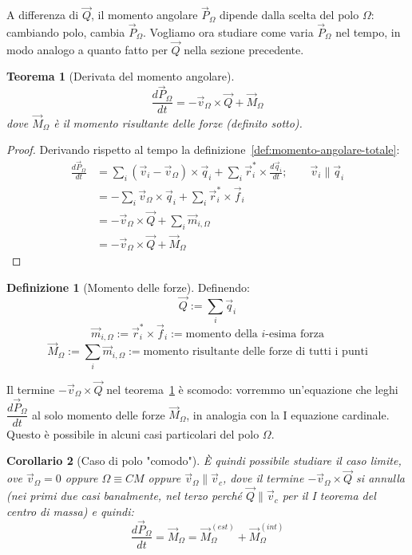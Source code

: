 \documentclass[11pt, a4paper, openright]{book}
\theoremstyle{plain}
\newtheorem{theorem}{Teorema}[section]
\newtheorem{corollario}[theorem]{Corollario}
\theoremstyle{definition}
\newtheorem{definizione}{Definizione}[section]
\begin{document}
A differenza di $\vec{Q}$, il momento angolare $\vec{P}_\Omega$ dipende
dalla scelta del polo $\Omega$: cambiando polo, cambia $\vec{P}_\Omega$.
Vogliamo ora studiare come varia $\vec{P}_\Omega$ nel tempo, in modo
analogo a quanto fatto per $\vec{Q}$ nella sezione precedente.

\begin{theorem}[Derivata del momento angolare]
\label{thm:derivata-momento-angolare}
\begin{equation}
    \frac{d\vec{P}_\Omega}{dt} = -\vec{v}_\Omega \times \vec{Q} + \vec{M}_{\Omega}
\end{equation}
dove $\vec{M}_\Omega$ è il momento risultante delle forze (definito
sotto).
\end{theorem}

\begin{proof}
Derivando rispetto al tempo la definizione~\ref{def:momento-angolare-totale}:
\begin{align}
    \frac{d\vec{P}_\Omega}{dt} & = \sum_i (\vec{v}_i - \vec{v}_\Omega) \times \vec{q}_i + \sum_i \vec{r}_i^* \times \frac{d\vec{q}_i}{dt}; \quad \quad \vec{v}_i \parallel \vec{q}_i \\
    & = -\sum_i \vec{v}_\Omega \times \vec{q}_i + \sum_i \vec{r}_i^* \times \vec{f}_i \\
    & = -\vec{v}_\Omega \times \vec{Q} + \sum_i \vec{m}_{i, \Omega} \\
    & = -\vec{v}_\Omega \times \vec{Q} + \vec{M}_{\Omega}
\end{align}
\end{proof}

\begin{definizione}[Momento delle forze]
\label{def:momento-forze}
Definendo:
\[\vec{Q} := \sum_i \vec{q}_i\]
\[\vec{m}_{i, \Omega} := \vec{r}_i^* \times \vec{f}_i := \text{momento della $i$-esima forza}\]
\[\vec{M}_{\Omega} := \sum_i \vec{m}_{i, \Omega} := \text{momento risultante delle forze di tutti i punti}\]
\end{definizione}

Il termine $-\vec{v}_\Omega \times \vec{Q}$ nel teorema~\ref{thm:derivata-momento-angolare}
è scomodo: vorremmo un'equazione che leghi $\dfrac{d\vec{P}_\Omega}{dt}$
al solo momento delle forze $\vec{M}_\Omega$, in analogia con la I
equazione cardinale. Questo è possibile in alcuni casi particolari
del polo $\Omega$.

\begin{corollario}[Caso di polo "comodo"]
\label{cor:caso-limite-polo}
È quindi possibile studiare il caso limite, ove $\vec{v}_\Omega = 0$
oppure $\Omega \equiv CM$ oppure $\vec{v}_\Omega \parallel \vec{v}_c$,
dove il termine $-\vec{v}_\Omega \times \vec{Q}$ si annulla (nei primi
due casi banalmente, nel terzo perché $\vec{Q}\parallel\vec{v}_c$ per il
I teorema del centro di massa) e quindi:
\begin{equation}
    \frac{d\vec{P}_\Omega}{dt} = \vec{M}_\Omega = \vec{M}_\Omega^{(est)} + \vec{M}_\Omega^{(int)}
\end{equation}
\end{corollario}
\end{document}
